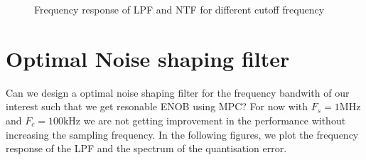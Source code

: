 \documentclass[a4paper]{article}
\begin{document}
\begin{figure}[!h]
\begin{minipage}{0.45\linewidth}
		\caption{Frequency response of LPF and NTF for different cutoff frequency}
		\label{fig:LPFNTFvsfreq}
	\end{minipage}
\end{figure}

\section{Optimal Noise shaping filter}
Can we design a optimal noise shaping filter for the frequency bandwith of our interest such that we get resonable ENOB using MPC? For now with $F_{s} = 1 \textrm{MHz}$ and $F_{c} = 100 \textrm{kHz}$ we are not getting improvement in the performance without increasing the sampling frequency. In the following figures, we plot the frequency response of the LPF and the spectrum of the quantisation error. 
\end{document}
